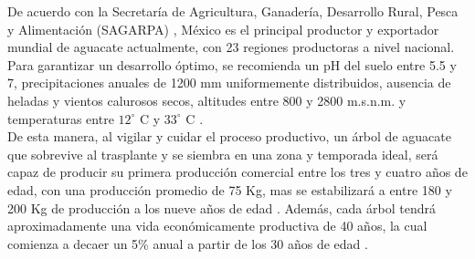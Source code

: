 De acuerdo con la Secretaría de Agricultura, Ganadería, Desarrollo Rural, Pesca y Alimentación (SAGARPA) \cite{SAGARPA_2017}, México es el principal productor y exportador mundial de aguacate actualmente, con 23 regiones productoras a nivel nacional. Para garantizar un desarrollo óptimo, se recomienda un pH del suelo entre 5.5 y 7, precipitaciones anuales de 1200 mm uniformemente distribuidos, ausencia de heladas y vientos calurosos secos, altitudes entre 800 y 2800 m.s.n.m. y temperaturas entre $12^\circ$ C y $33^\circ$ C \cite{CODESIN_2021}.\\


De esta manera, al vigilar y cuidar el proceso productivo, un árbol de aguacate que sobrevive al trasplante y se siembra en una zona y temporada ideal, será capaz de producir su primera producción comercial entre los tres y cuatro años de edad, con una producción promedio de 75 Kg, mas se estabilizará a entre 180 y 200 Kg de producción a los nueve años de edad \cite{Pena-Urquiza_2015}. Además, cada árbol tendrá aproximadamente una vida económicamente productiva de 40 años, la cual comienza a decaer un 5\% anual a partir de los 30 años de edad \cite{Mosquera_2015}.

\fi